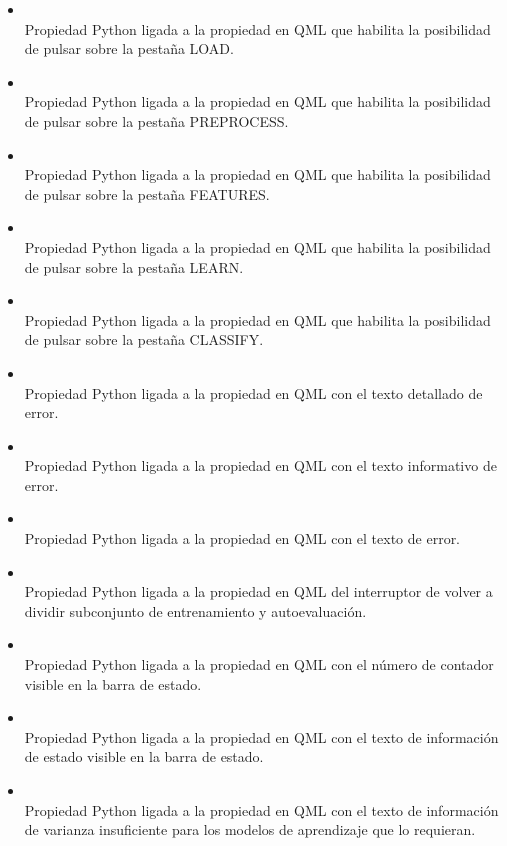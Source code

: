 \begin{itemize}
\item {}\\
Propiedad Python ligada a la propiedad en QML que habilita la posibilidad de pulsar sobre la pestaña LOAD.
\item {}\\
Propiedad Python ligada a la propiedad en QML que habilita la posibilidad de pulsar sobre la pestaña PREPROCESS.
\item {}\\
Propiedad Python ligada a la propiedad en QML que habilita la posibilidad de pulsar sobre la pestaña FEATURES.
\item {}\\
Propiedad Python ligada a la propiedad en QML que habilita la posibilidad de pulsar sobre la pestaña LEARN.
\item {}\\
Propiedad Python ligada a la propiedad en QML que habilita la posibilidad de pulsar sobre la pestaña CLASSIFY.
\item {}\\
Propiedad Python ligada a la propiedad en QML con el texto detallado de error.
\item {}\\
Propiedad Python ligada a la propiedad en QML con el texto informativo de error.
\item {}\\
Propiedad Python ligada a la propiedad en QML con el texto de error.
\item {}\\
Propiedad Python ligada a la propiedad en QML del interruptor de volver a dividir subconjunto de entrenamiento y autoevaluación.
\item {}\\
Propiedad Python ligada a la propiedad en QML con el número de contador visible en la barra de estado.
\item {}\\
Propiedad Python ligada a la propiedad en QML con el texto de información de estado visible en la barra de estado.
\item {}\\
Propiedad Python ligada a la propiedad en QML con el texto de información de varianza insuficiente para los modelos de aprendizaje que lo requieran.
\end{itemize}

